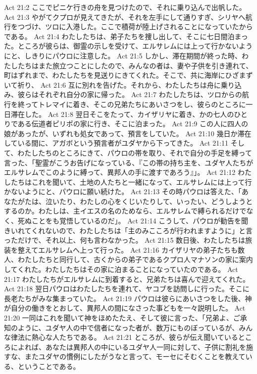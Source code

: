 Act 21:2  ここでピニケ行きの舟を見つけたので、それに乗り込んで出帆した。
Act 21:3  やがてクプロが見えてきたが、それを左手にして通りすぎ、シリヤへ航行をつづけ、ツロに入港した。ここで積荷が陸上げされることになっていたからである。
Act 21:4  わたしたちは、弟子たちを捜し出して、そこに七日間泊まった。ところが彼らは、御霊の示しを受けて、エルサレムには上って行かないようにと、しきりにパウロに注意した。
Act 21:5  しかし、滞在期間が終った時、わたしたちはまた旅立つことにしたので、みんなの者は、妻や子供を引き連れて、町はずれまで、わたしたちを見送りにきてくれた。そこで、共に海岸にひざまずいて祈り、
Act 21:6  互に別れを告げた。それから、わたしたちは舟に乗り込み、彼らはそれぞれ自分の家に帰った。
Act 21:7  わたしたちは、ツロからの航行を終ってトレマイに着き、そこの兄弟たちにあいさつをし、彼らのところに一日滞在した。
Act 21:8  翌日そこをたって、カイザリヤに着き、かの七人のひとりである伝道者ピリポの家に行き、そこに泊まった。
Act 21:9  この人に四人の娘があったが、いずれも処女であって、預言をしていた。
Act 21:10  幾日か滞在している間に、アガボという預言者がユダヤから下ってきた。
Act 21:11  そして、わたしたちのところにきて、パウロの帯を取り、それで自分の手足を縛って言った、「聖霊がこうお告げになっている、『この帯の持ち主を、ユダヤ人たちがエルサレムでこのように縛って、異邦人の手に渡すであろう』」。
Act 21:12  わたしたちはこれを聞いて、土地の人たちと一緒になって、エルサレムには上って行かないようにと、パウロに願い続けた。
Act 21:13  その時パウロは答えた、「あなたがたは、泣いたり、わたしの心をくじいたりして、いったい、どうしようとするのか。わたしは、主イエスの名のためなら、エルサレムで縛られるだけでなく、死ぬことをも覚悟しているのだ」。
Act 21:14  こうして、パウロが勧告を聞きいれてくれないので、わたしたちは「主のみこころが行われますように」と言っただけで、それ以上、何も言わなかった。
Act 21:15  数日後、わたしたちは旅装を整えてエルサレムへ上って行った。
Act 21:16  カイザリヤの弟子たちも数人、わたしたちと同行して、古くからの弟子であるクプロ人マナソンの家に案内してくれた。わたしたちはその家に泊まることになっていたのである。
Act 21:17  わたしたちがエルサレムに到着すると、兄弟たちは喜んで迎えてくれた。
Act 21:18  翌日パウロはわたしたちを連れて、ヤコブを訪問しに行った。そこに長老たちがみな集まっていた。
Act 21:19  パウロは彼らにあいさつをした後、神が自分の働きをとおして、異邦人の間になさった事どもを一々説明した。
Act 21:20  一同はこれを聞いて神をほめたたえ、そして彼に言った、「兄弟よ、ご承知のように、ユダヤ人の中で信者になった者が、数万にものぼっているが、みんな律法に熱心な人たちである。
Act 21:21  ところが、彼らが伝え聞いているところによれば、あなたは異邦人の中にいるユダヤ人一同に対して、子供に割礼を施すな、またユダヤの慣例にしたがうなと言って、モーセにそむくことを教えている、ということである。
